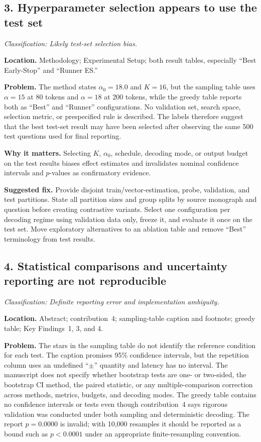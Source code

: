 \documentclass[11pt]{article}
\newcommand{\findinglabel}[1]{\textbf{#1}}
\newcommand{\classification}[1]{\textit{Classification: #1.}}
\begin{document}
\subsection*{3. Hyperparameter selection appears to use the test set}

\classification{Likely test-set selection bias}

\findinglabel{Location.} Methodology; Experimental Setup; both result tables, especially ``Best Early-Stop'' and ``Runner ES.''

\findinglabel{Problem.} The method states $\alpha_0=18.0$ and $K=16$, but the sampling table uses $\alpha=15$ at 80 tokens and $\alpha=18$ at 200 tokens, while the greedy table reports both as ``Best'' and ``Runner'' configurations.  No validation set, search space, selection metric, or prespecified rule is described.  The labels therefore suggest that the best test-set result may have been selected after observing the same 500 test questions used for final reporting.

\findinglabel{Why it matters.} Selecting $K$, $\alpha_0$, schedule, decoding mode, or output budget on the test results biases effect estimates and invalidates nominal confidence intervals and $p$-values as confirmatory evidence.

\findinglabel{Suggested fix.} Provide disjoint train/vector-estimation, probe, validation, and test partitions.  State all partition sizes and group splits by source monograph and question before creating contrastive variants.  Select one configuration per decoding regime using validation data only, freeze it, and evaluate it once on the test set.  Move exploratory alternatives to an ablation table and remove ``Best'' terminology from test results.

\subsection*{4. Statistical comparisons and uncertainty reporting are not reproducible}

\classification{Definite reporting error and implementation ambiguity}

\findinglabel{Location.} Abstract; contribution~4; sampling-table caption and footnote; greedy table; Key Findings~1, 3, and 4.

\findinglabel{Problem.} The stars in the sampling table do not identify the reference condition for each test.  The caption promises 95\% confidence intervals, but the repetition column uses an undefined ``$\pm$'' quantity and latency has no interval.  The manuscript does not specify whether bootstrap tests are one- or two-sided, the bootstrap CI method, the paired statistic, or any multiple-comparison correction across methods, metrics, budgets, and decoding modes.  The greedy table contains no confidence intervals or tests even though contribution~4 says rigorous validation was conducted under both sampling and deterministic decoding.  The report $p=0.0000$ is invalid; with 10,000 resamples it should be reported as a bound such as $p<0.0001$ under an appropriate finite-resampling convention.
\end{document}
